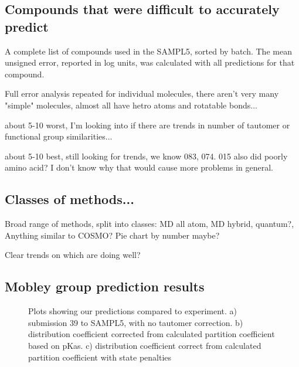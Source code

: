 \subsection{Compounds that were difficult to accurately predict}
\label{results:4}
\begin{table}
\footnotesize

\label{MoleculeTable}
\caption{A complete list of compounds used in the SAMPL5, sorted by batch. The mean unsigned error, reported in log units, was calculated with all predictions for that compound.} 
\end{table}

Full error analysis repeated for individual molecules, there aren't very many "simple" molecules, almost all have hetro atoms and rotatable bonds...

about 5-10 worst, I'm looking into if there are trends in number of tautomer or functional group similarities...

about 5-10 best, still looking for trends, we know 083, 074. 015 also did poorly amino acid? I don't know why that would cause more problems in general. 


\subsection{Classes of methods...}
\label{results:5}
Broad range of methods, split into classes: MD all atom, MD hybrid, quantum?, Anything similar to COSMO? %
Pie chart by number maybe?

Clear trends on which are doing well? 

\subsection{Mobley group prediction results}
\label{results:6}

\begin{figure*}
\caption{Plots showing our predictions compared to experiment. a) submission 39 to SAMPL5, with no tautomer correction. b) distribution coefficient corrected from calculated partition coefficient based on pKas. c) distribution coefficient correct from calculated partition coefficient with state penalties }
\label{myComparisons}       %
\end{figure*}

